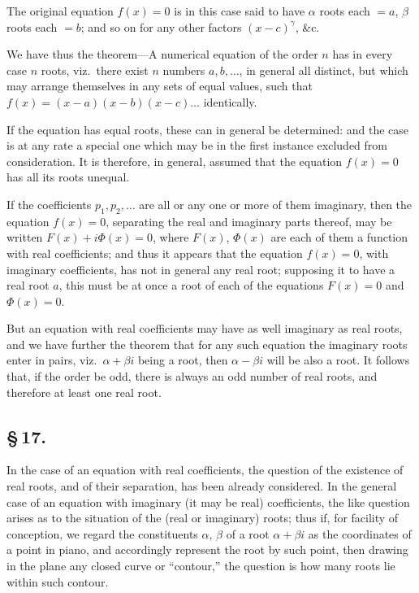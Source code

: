 \documentclass[11pt,a4paper]{book}
\begin{document}
The original equation $f(x) = 0$ is in this case said to have $\alpha$ roots each $=a$, $\beta$ roots each $=b$; and so on for any other factors $(x - c)^{\gamma}$, \&c.

We have thus the theorem---A numerical equation of the order $n$ has in every case $n$ roots, viz.\ there exist $n$ numbers $a, b, \ldots$, in general all distinct, but which may arrange themselves in any sets of equal values, such that $f(x) = (x - a)(x - b)(x - c)\ldots$ identically.

If the equation has equal roots, these can in general be determined: and the case is at any rate a special one which may be in the first instance excluded from consideration. It is therefore, in general, assumed that the equation $f(x) = 0$ has all its roots unequal.

If the coefficients $p_{1}, p_{2}, \ldots$ are all or any one or more of them imaginary, then the equation $f(x) = 0$, separating the real and imaginary parts thereof, may be written $F(x) + i\Phi(x) = 0$, where $F(x)$, $\Phi(x)$ are each of them a function with real coefficients; and thus it appears that the equation $f(x) = 0$, with imaginary coefficients, has not in general any real root; supposing it to have a real root $a$, this must be at once a root of each of the equations $F(x) = 0$ and $\Phi(x) = 0$.

But an equation with real coefficients may have as well imaginary as real roots, and we have further the theorem that for any such equation the imaginary roots enter in pairs, viz.\ $\alpha + \beta i$ being a root, then $\alpha - \beta i$ will be also a root. It follows that, if the order be odd, there is always an odd number of real roots, and therefore at least one real root.

\subsection*{\S\,17.}

In the case of an equation with real coefficients, the question of the existence of real roots, and of their separation, has been already considered. In the general case of an equation with imaginary (it may be real) coefficients, the like question arises as to the situation of the (real or imaginary) roots; thus if, for facility of conception, we regard the constituents $\alpha$, $\beta$ of a root $\alpha + \beta i$ as the coordinates of a point in piano, and accordingly represent the root by such point, then drawing in the plane any closed curve or ``contour,'' the question is how many roots lie within such contour.
\end{document}
